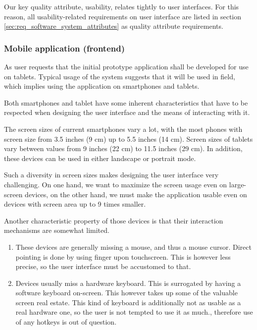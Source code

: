 \documentclass[11pt]{book}
\begin{document}
Our key quality attribute, usability, relates tightly to user interfaces. For this reason, all usability-related requirements on user interface are listed in section \ref{sec:req_software_system_attributes} as quality attribute requirements.

\subsubsection{Mobile application (frontend)}\label{sec:req_webapplication_frontend}
As user requests that the initial prototype application shall be developed for use on tablets. Typical usage of the system suggests that it will be used in field, which implies using the application on smartphones and tablets.

Both smartphones and tablet have some inherent characteristics that have to be respected when designing the user interface and the means of interacting with it.

The screen sizes of current smartphones vary a lot, with the most phones with screen size from 3.5 inches (9 cm) up to 5.5 inches (14 cm). Screen sizes of tablets vary between values from 9 inches (22 cm) to 11.5 inches (29 cm). In addition, these devices can be used in either landscape or portrait mode.

Such a diversity in screen sizes makes designing the user interface very challenging. On one hand, we want to maximize the screen usage even on large-screen devices, on the other hand, we must make the application usable even on devices with screen area up to 9 times smaller.

Another characteristic property of those devices is that their interaction mechanisms are somewhat limited.

\begin{enumerate}
  \item These devices are generally missing a mouse, and thus a mouse cursor. Direct pointing is done by using finger upon touchscreen. This is however less precise, so the user interface must be accustomed to that.
  \item Devices usually miss a hardware keyboard. This is surrogated by having a software keyboard on-screen. This however takes up some of the valuable screen real estate. This kind of keyboard is additionally not as usable as a real hardware one, so the user is not tempted to use it as much., therefore use of any hotkeys is out of question.
\end{enumerate}
\end{document}
